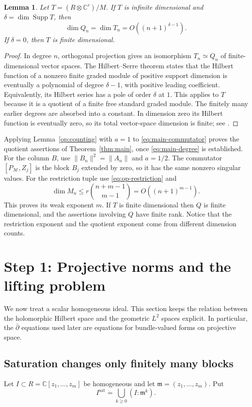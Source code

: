 \documentclass[11pt,reqno]{amsart}
\numberwithin{equation}{section}
\newtheorem{lemma}[theorem]{Lemma}
\theoremstyle{definition}
\theoremstyle{remark}
\newcommand{\C}{\mathbb C}
\DeclareMathOperator{\Supp}{Supp}
\begin{document}
\begin{lemma}\label{op:hilbert}
Let $T=(R\otimes\C^r)/M$.  If $T$ is infinite dimensional and
$\delta=\dim\Supp T$, then
\[
 \dim Q_n=\dim T_n=O((n+1)^{\delta-1}).
\]
If $\delta=0$, then $T$ is finite dimensional.
\end{lemma}
\begin{proof}
In degree $n$, orthogonal projection gives an isomorphism
$T_n\simeq Q_n$ of finite-dimensional vector spaces.  The
Hilbert--Serre theorem states that the Hilbert function of a nonzero
finite graded module of positive support dimension is eventually a
polynomial of degree $\delta-1$, with positive leading coefficient.
Equivalently, its Hilbert series has a pole of order $\delta$ at $1$.
This applies to $T$ because it is a quotient of a finite free standard
graded module.  The finitely many earlier degrees are absorbed into a
constant.  In dimension zero its Hilbert function is eventually zero,
so its total vector-space dimension is finite; see
\cite{SerreFAC,StacksHilbert}.
\end{proof}

Applying Lemma~\ref{op:counting} with $a=1$ to
\eqref{eq:main-commutator} proves the quotient assertions of
Theorem~\ref{thm:main}, once \eqref{eq:main-degree} is established.
For the column $B$, use $\|B_n\|^2=\|A_n\|$ and $a=1/2$.
The commutator $[P_{\mathcal M},Z_j]$ is the block $B_j$ extended by
zero, so it has the same nonzero singular values.  For the restriction
tuple use \eqref{eq:op-restriction} and
\[
 \dim M_n\le r\binom{n+m-1}{m-1}=O((n+1)^{m-1}).
\]
This proves its weak exponent $m$.  If $T$ is finite dimensional then
$Q$ is finite dimensional, and the assertions involving $Q$ have finite
rank.  Notice that the restriction exponent and the quotient exponent
come from different dimension counts.



\section{Step 1: Projective norms and the lifting problem}
\label{sec:projective}

We now treat a scalar homogeneous ideal.  This section keeps the relation
between the holomorphic Hilbert space and the geometric $L^2$ spaces
explicit.  In particular, the $\bar\partial$ equations used later are
equations for bundle-valued forms on projective space.

\subsection{Saturation changes only finitely many blocks}
Let $I\subset R=\C[z_1,\ldots,z_m]$ be homogeneous and let
$\mathfrak m=(z_1,\ldots,z_m)$.  Put
\[
 I^{\mathrm{sat}}=\bigcup_{k\ge0}(I:\mathfrak m^k).
\]
\end{document}
